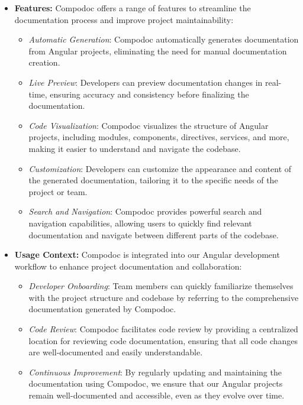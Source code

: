 \begin{itemize}
    \item \textbf{Features:} Compodoc offers a range of features to streamline the documentation process and improve project maintainability:
    \begin{itemize}
        \item \textit{Automatic Generation}: Compodoc automatically generates documentation from Angular projects, eliminating the need for manual documentation creation.
        \item \textit{Live Preview}: Developers can preview documentation changes in real-time, ensuring accuracy and consistency before finalizing the documentation.
        \item \textit{Code Visualization}: Compodoc visualizes the structure of Angular projects, including modules, components, directives, services, and more, making it easier to understand and navigate the codebase.
        \item \textit{Customization}: Developers can customize the appearance and content of the generated documentation, tailoring it to the specific needs of the project or team.
        \item \textit{Search and Navigation}: Compodoc provides powerful search and navigation capabilities, allowing users to quickly find relevant documentation and navigate between different parts of the codebase.
    \end{itemize}
    \item \textbf{Usage Context:} Compodoc is integrated into our Angular development workflow to enhance project documentation and collaboration:
    \begin{itemize}
        \item \textit{Developer Onboarding}: Team members can quickly familiarize themselves with the project structure and codebase by referring to the comprehensive documentation generated by Compodoc.
        \item \textit{Code Review}: Compodoc facilitates code review by providing a centralized location for reviewing code documentation, ensuring that all code changes are well-documented and easily understandable.
        \item \textit{Continuous Improvement}: By regularly updating and maintaining the documentation using Compodoc, we ensure that our Angular projects remain well-documented and accessible, even as they evolve over time.
    \end{itemize}
\end{itemize}

